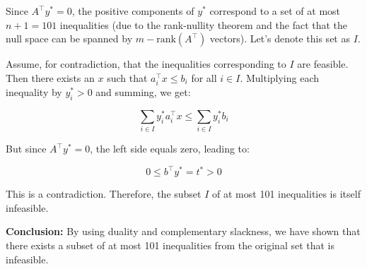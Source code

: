 \documentclass[12pt,letterpaper]{article}
\begin{document}
Since $A^\top y^* = 0$, the positive components of $y^*$ correspond to a set of at most $n + 1 = 101$ inequalities (due to the rank-nullity theorem and the fact that the null space can be spanned by $m - \text{rank}(A^\top)$ vectors). Let's denote this set as $I$.

Assume, for contradiction, that the inequalities corresponding to $I$ are feasible. Then there exists an $x$ such that $a_i^\top x \leq b_i$ for all $i \in I$. Multiplying each inequality by $y_i^* > 0$ and summing, we get:

\[\sum_{i \in I} y_i^* a_i^\top x \leq \sum_{i \in I} y_i^* b_i\]

But since $A^\top y^* = 0$, the left side equals zero, leading to:

\[0 \leq b^\top y^* = t^* > 0\]

This is a contradiction. Therefore, the subset $I$ of at most 101 inequalities is itself infeasible.

\textbf{Conclusion:} By using duality and complementary slackness, we have shown that there exists a subset of at most 101 inequalities from the original set that is infeasible.
\end{document}
